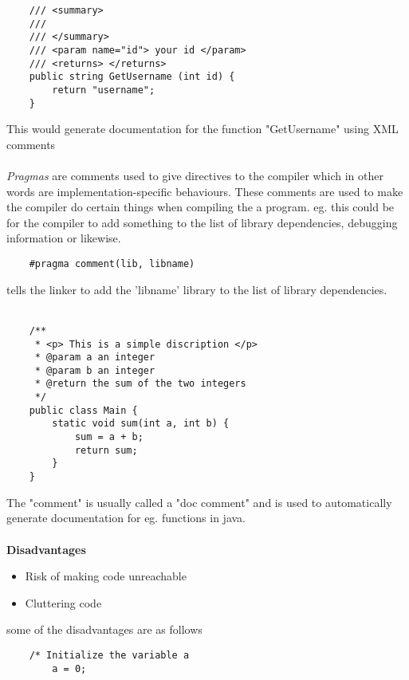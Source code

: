 \begin{verbatim}
    /// <summary>
    ///
    /// </summary>
    /// <param name="id"> your id </param>
    /// <returns> </returns>
    public string GetUsername (int id) {
        return "username";
    }
\end{verbatim}
This would generate documentation for the function "GetUsername" using XML comments
\\
\\
\emph{Pragmas} are comments used to give directives to the compiler which in other words
are implementation-specific behaviours. These comments are used to make the compiler do certain things
when compiling the a program. eg. this could be for the compiler to add something to the list
of library dependencies, debugging information or likewise.

\begin{verbatim}
    #pragma comment(lib, libname)
\end{verbatim}
tells the linker to add the 'libname' library to the list of library dependencies.
\\
\\

\begin{verbatim}
    /**
     * <p> This is a simple discription </p>
     * @param a an integer
     * @param b an integer
     * @return the sum of the two integers
     */
    public class Main {
        static void sum(int a, int b) {
            sum = a + b;
            return sum;
        }
    }
\end{verbatim}
The "comment" is usually called a "doc comment" and is used to automatically generate documentation for
eg. functions in java.
\\
\\

\noindent
\textbf{Disadvantages}
\begin{itemize}
    \item Risk of making code unreachable
    \item Cluttering code 
\end{itemize}
some of the disadvantages are as follows

\begin{verbatim}
    /* Initialize the variable a
        a = 0;

    \end{verbatim}

